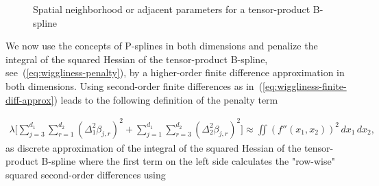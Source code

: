 \documentclass[10pt,a4paper]{report}
\begin{document}
\begin{figure}[H]
	\centering
	\caption{Spatial neighborhood or adjacent parameters for a tensor-product B-spline}
	\label{fig:tps-neighborhood}
\end{figure}
%
We now use the concepts of P-splines in both dimensions and penalize the integral of the squared Hessian of the tensor-product B-spline, see~(\ref{eq:wiggliness-penalty}), by a higher-order finite difference approximation in both dimensions. Using second-order finite differences as in~(\ref{eq:wiggliness-finite-diff-approx}) leads to the following definition of the penalty term

\begin{align}
	\lambda \big[ \sum_{j=3}^{d_1} \sum_{r=1}^{d_2} (\Delta_1^2 \beta_{j,r})^2 + \sum_{j=1}^{d_1} \sum_{r=3}^{d_2} (\Delta_2^2 \beta_{j,r})^2 \big] \approx \iint (f''(x_1, x_2))^2 \,dx_1 \,dx_2,
\end{align}
%
as discrete approximation of the integral of the squared Hessian of the tensor-product B-spline where the first term on the left side calculates the "row-wise" squared second-order differences using
\end{document}
